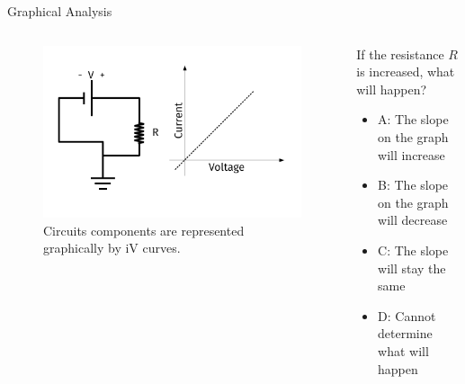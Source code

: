 \documentclass{beamer}
\begin{document}
\begin{frame}{Graphical Analysis}
\begin{columns}[T]
\begin{column}{0.5\textwidth}
\begin{figure}
\centering
\includegraphics[width=\textwidth,trim=0.5cm 0cm 1cm 0cm,clip=true]{figures/iVCurve.pdf}
\caption{\label{fig:iVCurve1} Circuits components are represented graphically by iV curves.}
\end{figure}
\end{column}
\begin{column}{0.5\textwidth}
\small
If the resistance $R$ is increased, what will happen?
\begin{itemize}
\item A: The slope on the graph will increase
\item B: The slope on the graph will decrease
\item C: The slope will stay the same
\item D: Cannot determine what will happen
\end{itemize}
\end{column}
\end{columns}
\end{frame}
\end{document}
